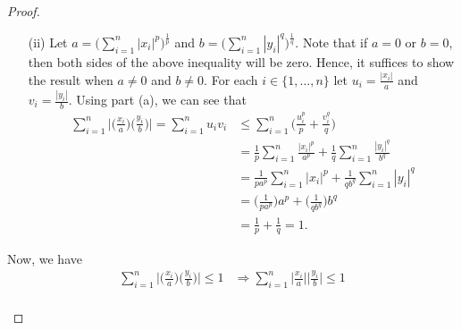\documentclass[a4paper]{article}
\begin{document}
\begin{proof}
\begin{enumerate}
\begin{enumerate}
            \item[(ii)] Let \( a = \Big(  \sum_{ i=1  }^{ n } | {x}_{i} |^{p} \Big)^{\frac{ 1 }{ p }} \) and \( b = \Big(  \sum_{ i=1  }^{ n } | {y}_{i} |^{q} \Big)^{\frac{ 1 }{ q } } \). Note that if \( a = 0  \) or \( b = 0  \), then both sides of the above inequality will be zero. Hence, it suffices to show the result when \( a \neq 0  \) and \( b \neq 0  \). For each \( i \in \{ 1, \dots, n \}  \) let \( {u}_{i} = \frac{ | {x}_{i} |  }{ a }  \) and \( {v}_{i} = \frac{ | {y}_{i} |  }{ b }  \). Using part (a), we can see that 
                \begin{align*}
                    \sum_{ i=1  }^{ n } \Big|  \Big(  \frac{ {x}_{i} }{ a }  \Big) \Big(  \frac{ {y}_{i} }{ b }  \Big) \Big| = \sum_{ i=1  }^{ n } {u}_{i} {v}_{i} &\leq \sum_{ i=1  }^{ n } \Big(  \frac{ {u}_{i}^{p} }{ p }  + \frac{ {v}_{i}^{q} }{ q }  \Big) \\
                                                                                                                                                                   &= \frac{ 1 }{ p } \sum_{ i=1  }^{ n } \frac{ | {x}_{i} |^{p} }{  a^{p} }  + \frac{ 1 }{ q }  \sum_{ i=1  }^{ n } \frac{ | {y}_{i} |^{q} }{ b^{q} } \\
                                                                                                                                                                   &= \frac{ 1 }{ p a^{p} }  \sum_{ i=1  }^{ n } | {x}_{i} |^{p} + \frac{ 1 }{ q b^{q} }  \sum_{ i=1  }^{ n } | {y}_{i} |^{q} \\
                                                                                                                                                                   &= \Big(  \frac{ 1 }{ p a^{p} }   \Big) a^{p} + \Big(  \frac{ 1  }{ q b^{q} }  \Big) b^{q} \\
                                                                                                                                                                   &= \frac{ 1 }{ p }  + \frac{ 1 }{ q }  = 1.
                \end{align*}
            \end{enumerate}
            Now, we have 
    \begin{align*}  \sum_{ i=1  }^{ n } \Big| \Big(  \frac{ {x}_{i} }{ a }  \Big) \Big(  \frac{ {y}_{i} }{ b }  \Big) \Big| \leq 1 &\Longrightarrow \sum_{ i=1  }^{ n }  \Big|  \frac{ {x}_{i} }{ a }  \Big| \Big|  \frac{ {y}_{i} }{ b }  \Big| \leq 1  \\

\end{align*}
\end{enumerate}
\end{proof}
\end{document}

